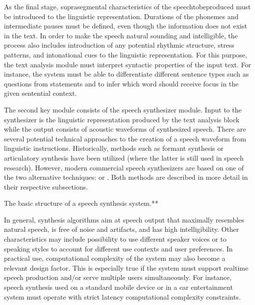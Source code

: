 \documentclass[letterpaper,10pt,english]{jupyterBook}
\begin{document}
\sphinxAtStartPar
As the final stage, suprasegmental characteristics of the
speech\sphinxhyphen{}to\sphinxhyphen{}be\sphinxhyphen{}produced must be introduced to the linguistic
representation. Durations of the phonemes and intermediate pauses must
be defined, even though the information does not exist in the text. In
order to make the speech natural sounding and intelligible, the process
also includes introduction of any potential rhythmic structure, stress
patterns, and intonational cues to the linguistic representation. For
this purpose, the text analysis module must interpret syntactic
properties of the input text. For instance, the system must be able to
differentiate different sentence types such as questions from statements
and to infer which word should receive focus in the given sentential
context.

\sphinxAtStartPar
{}

\sphinxAtStartPar
The second key module consists of the speech synthesizer module. Input
to the synthesizer is the linguistic representation produced by the text
analysis block while the output consists of acoustic waveforms of
synthesized speech. There are several potential technical approaches to
the creation of a speech waveform from linguistic instructions.
Historically, methods such as formant synthesis or articulatory
synthesis have been utilized (where the latter is still used in speech
research). However, modern commercial speech synthesizers are based on
one of the two alternative techniques: {\hyperref[\detokenize{Synthesis/Concatenative_speech_synthesis::doc}]{}} or {\hyperref[\detokenize{Synthesis/Statistical_parametric_speech_synthesis::doc}]{}}. Both methods
are described in more detail in their respective sub\sphinxhyphen{}sections.

\sphinxAtStartPar
{}
 The basic structure of a speech synthesis system.**

\sphinxAtStartPar
In general, synthesis algorithms aim at speech output that maximally
resembles natural speech, is free of noise and artifacts, and has high
intelligibility. Other characteristics may include possibility to use
different speaker voices or to speaking styles to account for different
use contexts and user preferences. In practical use, computational
complexity of the system may also become a relevant design factor. This
is especially true if the system must support real\sphinxhyphen{}time speech
production and/or serve multiple users simultaneously. For instance,
speech synthesis used on a standard mobile device or in a car
entertainment system must operate with strict latency computational
complexity constraints.
\end{document}

